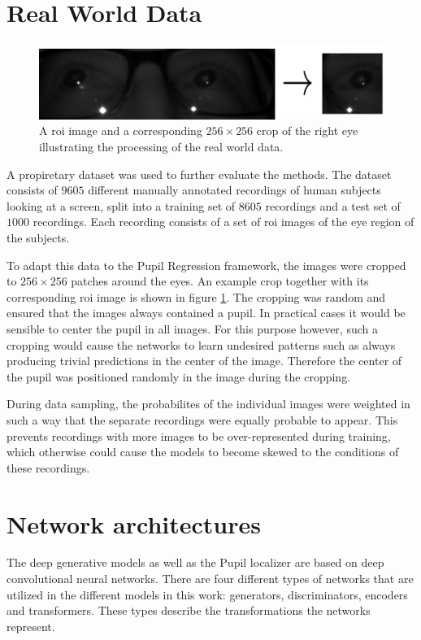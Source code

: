 \section{Real World Data}
\begin{figure}[t]
    \centering
    \includegraphics[width=\textwidth]{images/misc/roi_to_crop.pdf}
    \caption{A \acrshort{roi} image and a corresponding $256\times256$ crop of the right eye illustrating the processing of the real world data.}
    \label{fig:roitocrop}
\end{figure}
A propiretary dataset was used to further evaluate the methods. The dataset consists of $9605$ different manually annotated recordings of human subjects looking at a screen, split into a training set of $8605$ recordings and a test set of $1000$ recordings. Each recording consists of a set of \acrfull{roi} images of the eye region of the subjects. 

To adapt this data to the Pupil Regression framework, the images were cropped to $256\times256$ patches around the eyes. An example crop together with its corresponding \acrshort{roi} image is shown in figure \ref{fig:roitocrop}. The cropping was random and ensured that the images always contained a pupil. In practical cases it would be sensible to center the pupil in all images. For this purpose however, such a cropping would cause the networks to learn undesired patterns such as always producing trivial predictions in the center of the image. Therefore the center of the pupil was positioned randomly in the image during the cropping. 

During data sampling, the probabilites of the individual images were weighted in such a way that the separate recordings were equally probable to appear. This prevents recordings with more images to be over-represented during training, which otherwise could cause the models to become skewed to the conditions of these recordings.

\section{Network architectures}
The deep generative models as well as the Pupil localizer are based on deep convolutional neural networks. There are four different types of networks that are utilized in the different models in this work: generators, discriminators, encoders and transformers. These types describe the transformations the networks represent.

